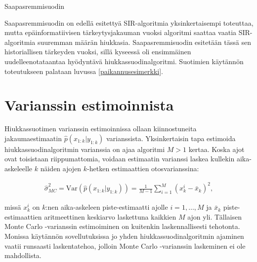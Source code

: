 \documentclass[
  12pt,
  a4paper, twoside]{book}
\begin{document}
\begin{algorithm}[H]
\label{saapasremmisuodin}
\DontPrintSemicolon
\SetAlgoShortEnd
{}
\caption{Saapasremmisuodin}
\end{algorithm}

Saapasremmisuodin on edellä esitettyä SIR-algoritmia yksinkertaisempi toteuttaa, mutta epäinformatiivisen tärkeytysjakauman vuoksi algoritmi saattaa vaatia SIR-algoritmia suuremman määrän hiukkasia. Saapasremmisuodin esitetään tässä sen historiallisen tärkeyden vuoksi, sillä kyseessä oli ensimmäinen uudelleenotataantaa hyödyntävä hiukkassuodinalgoritmi. Suotimien käytännön toteutukseen palataan luvussa \ref{paikannusesimerkki}.

\section{Varianssin estimoinnista} \label{varianssin-estimointi}

Hiukkassuotimen varianssin estimoinnissa ollaan kiinnostuneita jakaumaestimaatin \(\hat{p}(x_{1:k}|y_{1:k})\) varianssista. Yksinkertaisin tapa estimoida hiukkassuodinalgoritmin varianssia on ajaa algoritmi \(M > 1\) kertaa. Koska ajot ovat toisistaan riippumattomia, voidaan estimaatin varianssi laskea kullekin aika-askeleelle \(k\) näiden ajojen \(k\)-hetken estimaattien otosvarianssina:

\begin{align}\label{MC-varianssi}
\hat{\sigma}^2_{MC} = \text{Var}(\hat{p}(x_{1:k}|y_{1:k})) = \frac{1}{M-1} \sum_{i=1}^{M}(x_k^i-\bar{x}_k)^2
,\end{align}

\noindent missä \(x_k^i\) on \(k\):nen aika-askeleen piste-estimaatti ajolle \(i=1,\ldots,M\) ja \(\bar{x}_k\) piste-estimaattien aritmeettinen keskiarvo laskettuna kaikkien \(M\) ajon yli. Tällaisen Monte Carlo -varianssin estimoiminen on kuitenkin laskennallisesti tehotonta. Monissa käytännön sovellutuksissa jo yhden hiukkassuodinalgoritmin ajaminen vaatii runsaasti laskentatehoa, jolloin Monte Carlo -varianssin laskeminen ei ole mahdollista.
\end{document}
